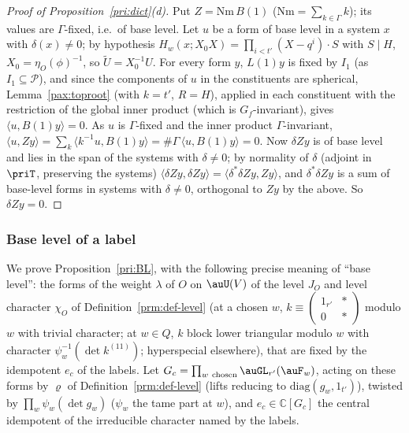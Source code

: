 \documentclass[10pt]{amsart}
\theoremstyle{definition}
\theoremstyle{remark}
\newcommand{\C}{\mathbb C}
\begin{document}
\begin{proof}[Proof of Proposition~\ref{pri:dict}(d)]
Put $Z=\mathrm{Nm}\,B(1)$ ($\mathrm{Nm}=\sum_{k\in\Gamma}k$); its values are $\Gamma$-fixed, i.e.\ of
base level. Let $u$ be a form of base level in a system $x$ with $\delta(x)\ne0$; by hypothesis
$H_w(x;X_0X)=\prod_{i<t'}(X-q^i)\cdot S$ with $S\mid H$, $X_0=\eta_O(\phi)^{-1}$, so $\tilde U=X_0^{-1}U$.
For every form $y$, $L(1)y$ is fixed by $I_1$ (as $I_1\subseteq\mathcal P$), and since the
components of $u$ in the constituents are spherical, Lemma~\ref{pax:toproot} (with $k=t'$, $R=H$),
applied in each constituent with the restriction of the global inner product (which is
$G_f$-invariant), gives $\langle u,B(1)y\rangle=0$. As $u$ is $\Gamma$-fixed and the inner product
$\Gamma$-invariant, $\langle u,Zy\rangle=\sum_k\langle k^{-1}u,B(1)y\rangle=\#\Gamma\,\langle u,B(1)y
\rangle=0$. Now $\delta Zy$ is of base level and lies in the span of the systems with $\delta\ne0$;
by normality of $\delta$ (adjoint in $\priT$, preserving the systems) $\langle\delta Zy,\delta Zy\rangle
=\langle\delta^*\delta Zy,Zy\rangle$, and $\delta^*\delta Zy$ is a sum of base-level forms in systems
with $\delta\ne0$, orthogonal to $Zy$ by the above. So $\delta Zy=0$.
\end{proof}

\subsubsection{Base level of a label}\label{pax:ss-BL}

We prove Proposition~\ref{pri:BL}, with the following precise meaning of ``base level'': the forms
of the weight $\lambda$ of $O$ on $\auU(V)$ of the level $J_O$ and level character $\chi_O$ of
Definition~\ref{prm:def-level} (at a chosen $w$, $k\equiv\left(\begin{smallmatrix}1_{r'}&*\\0&*
\end{smallmatrix}\right)$ modulo $w$ with trivial character; at $w\in Q$, $k$ block lower triangular
modulo $w$ with character $\psi_w^{-1}(\det k^{(11)})$; hyperspecial elsewhere), that are fixed by the
idempotent $e_c$ of the labels. Let $G_c=\prod_{w\ \mathrm{chosen}}\auGL_{r'}(\auF_w)$, acting on
these forms by $\varrho$ of Definition~\ref{prm:def-level} (lifts reducing to $\mathrm{diag}(g_w,
1_{t'})$), twisted by $\prod_w\psi_w(\det g_w)$ ($\psi_w$
the tame part at $w$), and $e_c\in\C[G_c]$ the central idempotent of the irreducible character named
by the labels.
\end{document}
